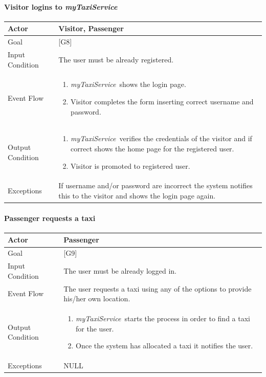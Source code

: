 \documentclass[a4paper,11pt]{report} %
\newcommand{\mts}{\mbox{\normalfont\itshape myTaxiService\ }}
\begin{document}
	\paragraph{Visitor logins to \mts}
	\begin{center}
		\begin{tabular}{| l | p{9cm} |}\hline
			Actor & Visitor, Passenger\\\hline
			Goal & {[}G8{]} \\\hline
			Input Condition & The user must be already registered.\\\hline
			Event Flow & \begin{enumerate}
							\item \mts shows the login page.
							\item Visitor completes the form inserting correct username and password.
						 \end{enumerate}\\\hline
			Output Condition & \begin{enumerate}
									\item \mts verifies the credentials of the visitor and if correct shows the home page for the registered user.
									\item Visitor is promoted to registered user.
							   \end{enumerate}\\\hline
			Exceptions & If username and/or password are incorrect the system notifies this to the visitor and shows the login page again.\\\hline
		\end{tabular}
	\end{center}
	
	\pagebreak
	
	\paragraph{Passenger requests a taxi}
	\begin{center}
		\begin{tabular}{| l | p{9cm} |}\hline
			Actor & Passenger\\\hline
			Goal & {[}G9{]} \\\hline
			Input Condition & The user must be already logged in.\\\hline
			Event Flow & The user requests a taxi using any of the options to provide his/her own location.\\\hline
			Output Condition & \begin{enumerate}
									\item \mts starts the process in order to find a taxi for the user.
									\item Once the system has allocated a taxi it notifies the user.
							   \end{enumerate}\\\hline
			Exceptions & NULL\\\hline
		\end{tabular}
	\end{center}	
	
\end{document}

